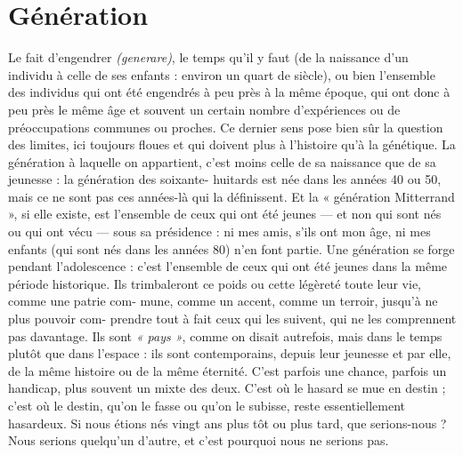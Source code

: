\section{Génération}
Le fait d’engendrer {\it (generare)}, le temps qu’il y faut (de la
naissance d’un individu à celle de ses enfants : environ un
quart de siècle), ou bien l’ensemble des individus qui ont été engendrés à peu
près à la même époque, qui ont donc à peu près le même âge et souvent un certain
nombre d’expériences ou de préoccupations communes ou proches. Ce
dernier sens pose bien sûr la question des limites, ici toujours floues et qui doivent
plus à l’histoire qu’à la génétique. La génération à laquelle on appartient,
c’est moins celle de sa naissance que de sa jeunesse : la génération des soixante-
huitards est née dans les années 40 ou 50, mais ce ne sont pas ces années-là qui
la définissent. Et la « génération Mitterrand », si elle existe, est l’ensemble de
ceux qui ont été jeunes — et non qui sont nés ou qui ont vécu — sous sa
présidence : ni mes amis, s’ils ont mon âge, ni mes enfants (qui sont nés dans
les années 80) n’en font partie. Une génération se forge pendant l’adolescence :
c’est l’ensemble de ceux qui ont été jeunes dans la même période historique. Ils
trimbaleront ce poids ou cette légèreté toute leur vie, comme une patrie com-
mune, comme un accent, comme un terroir, jusqu'à ne plus pouvoir com-
prendre tout à fait ceux qui les suivent, qui ne les comprennent pas davantage.
Ils sont {\it « pays »}, comme on disait autrefois, mais dans le temps plutôt que dans
l’espace : ils sont contemporains, depuis leur jeunesse et par elle, de la même
histoire ou de la même éternité. C’est parfois une chance, parfois un handicap,
plus souvent un mixte des deux. C’est où le hasard se mue en destin ; c’est où
le destin, qu’on le fasse ou qu’on le subisse, reste essentiellement hasardeux. Si
nous étions nés vingt ans plus tôt ou plus tard, que serions-nous ? Nous serions
quelqu’un d’autre, et c’est pourquoi nous ne serions pas.

